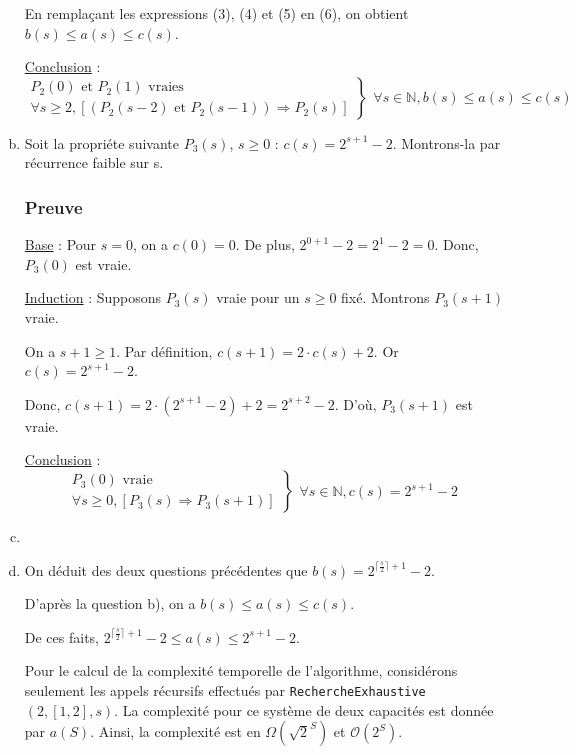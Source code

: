 \documentclass[12pt,a4paper]{article}
\begin{document}
\begin{enumerate}[a)]
En rempla\c{c}ant les expressions (3), (4) et (5) en (6), on obtient
$ b(s) \leq a(s) \leq c(s) $.

\medskip
\underline{Conclusion} : 
\begin{equation*}
\left .\begin{array}{l}
P_{2}(0) \text{ et } P_{2}(1) \text{ vraies } \\
\forall s \geq 2, [(P_{2}(s-2) \text{ et } P_{2}(s-1)) \Rightarrow P_{2}(s) ]
\end{array} \right \}
\left .\begin{array}{l}
\forall s \in \mathbb{N}, b(s) \leq a(s) \leq c(s)
\end{array}\right .
\end{equation*}

\item Soit la propri\'ete suivante \( P_{3}(s) \), $s \geq 0$ : $c(s) = 2^{s+1} - 2$.
Montrons-la par r\'ecurrence faible sur s.

\subsubsection*{Preuve}
\underline{Base} : Pour \( s = 0\), on a $c(0) = 0 $. De plus, $ 2^{0+1} - 2 = 2^1 - 2 = 0$. Donc, $P_{3}(0)$ est vraie.

\medskip
\underline{Induction} : Supposons \( P_{3}(s) \) vraie pour un \( s \geq 0 \) fix\'e. Montrons \( P_{3}(s+1) \) vraie.

On a $ s+1 \geq 1 $. 
Par d\'efinition, $c(s+1) = 2\cdot c(s) + 2$. Or $c(s) = 2^{s+1} - 2$.

Donc, $c(s+1) = 2 \cdot (2^{s+1} - 2) + 2 = 2^{s+2} - 2$. D'o\`u, $P_{3}(s+1)$ est vraie.

\medskip
\underline{Conclusion} : 
\begin{equation*}
\left .\begin{array}{l}
P_{3}(0) \text{ vraie } \\
\forall s \geq 0, [P_{3}(s) \Rightarrow P_{3}(s+1) ]
\end{array} \right \}
\left .\begin{array}{l}
\forall s \in \mathbb{N}, c(s) = 2^{s+1} - 2
\end{array}\right .
\end{equation*}

\item {}

\item On d\'eduit des deux questions pr\'ec\'edentes que $ b(s) = 2^{\lceil \frac{s}{2} \rceil + 1} - 2 $.

D'apr\`es la question b), on a $ b(s) \leq a(s) \leq c(s) $. 

De ces faits, $ 2^{\lceil \frac{s}{2} \rceil + 1} - 2 \leq a(s) \leq 2^{s+1} - 2 $.

Pour le calcul de la complexit\'e temporelle de l'algorithme, consid\'erons seulement les appels r\'ecursifs effectu\'es par \texttt{RechercheExhaustive}$(2,[1,2],s)$.
La complexit\'e pour ce syst\`eme de deux capacit\'es est donn\'ee par $a(S)$. Ainsi, la complexit\'e est en $\Omega(\sqrt{2}^S)$ et $\mathcal{O}(2^S)$.

\end{enumerate}
\end{document}
